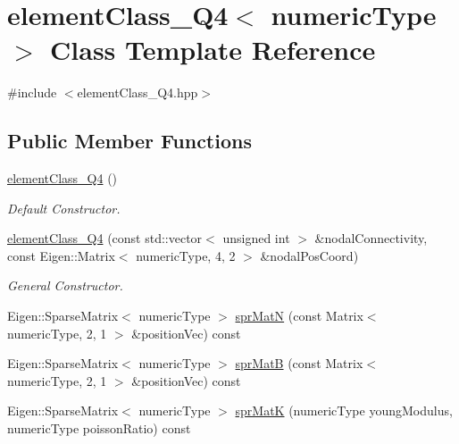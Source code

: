 \hypertarget{classelement_class___q4}{}\section{element\+Class\+\_\+\+Q4$<$ numeric\+Type $>$ Class Template Reference}
\label{classelement_class___q4}


{\ttfamily \#include $<$element\+Class\+\_\+\+Q4.\+hpp$>$}

\subsection*{Public Member Functions}
\begin{DoxyCompactItemize}
\item 
\mbox{\label{classelement_class___q4_a394807d1b7b587bdf8a9fef0ad207cb0}} 
\mbox{\hyperlink{classelement_class___q4_a394807d1b7b587bdf8a9fef0ad207cb0}{element\+Class\+\_\+\+Q4}} ()
\begin{DoxyCompactList}\small\item\em Default Constructor. \end{DoxyCompactList}\item 
\mbox{\label{classelement_class___q4_a26cbfc05c8238f05269a7a596bed8264}} 
\mbox{\hyperlink{classelement_class___q4_a26cbfc05c8238f05269a7a596bed8264}{element\+Class\+\_\+\+Q4}} (const std\+::vector$<$ unsigned int $>$ \&nodal\+Connectivity, const Eigen\+::\+Matrix$<$ numeric\+Type, 4, 2 $>$ \&nodal\+Pos\+Coord)
\begin{DoxyCompactList}\small\item\em General Constructor. \end{DoxyCompactList}\item 
Eigen\+::\+Sparse\+Matrix$<$ numeric\+Type $>$ \mbox{\hyperlink{classelement_class___q4_adc47e0786349f327fe45e3744080d3c5}{spr\+MatN}} (const Matrix$<$ numeric\+Type, 2, 1 $>$ \&position\+Vec) const
\item 
Eigen\+::\+Sparse\+Matrix$<$ numeric\+Type $>$ \mbox{\hyperlink{classelement_class___q4_a7503f92c139700e19433c2843496b670}{spr\+MatB}} (const Matrix$<$ numeric\+Type, 2, 1 $>$ \&position\+Vec) const
\item 
Eigen\+::\+Sparse\+Matrix$<$ numeric\+Type $>$ \mbox{\hyperlink{classelement_class___q4_afcfb65b64fe9909300405219739ed496}{spr\+MatK}} (numeric\+Type young\+Modulus, numeric\+Type poisson\+Ratio) const

\end{DoxyCompactItemize}
